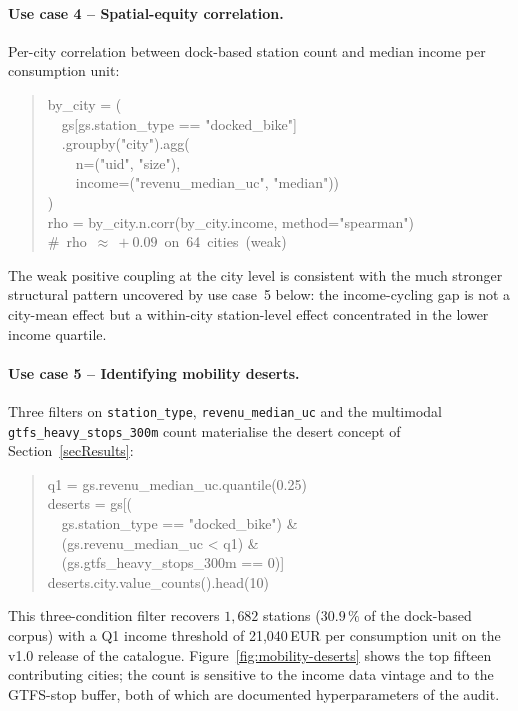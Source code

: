 \documentclass[11pt,a4paper]{article}
\begin{document}
\paragraph{Use case 4 -- Spatial-equity correlation.}
Per-city correlation between dock-based station count and median
income per consumption unit:
\begin{quote}\small\ttfamily
by\_city = (\\
\ \ gs[gs.station\_type == "docked\_bike"]\\
\ \ .groupby("city").agg(\\
\ \ \ \ n=("uid", "size"),\\
\ \ \ \ income=("revenu\_median\_uc", "median"))\\
)\\
rho = by\_city.n.corr(by\_city.income, method="spearman")\\
\#\ rho\ $\approx\ +0.09$\ on\ 64\ cities\ (weak)
\end{quote}
The weak positive coupling at the city level is consistent with the
much stronger structural pattern uncovered by use case~5 below: the
income-cycling gap is not a city-mean effect but a within-city
station-level effect concentrated in the lower income quartile.

\paragraph{Use case 5 -- Identifying mobility deserts.}
Three filters on \texttt{station\_type}, \texttt{revenu\_median\_uc}
and the multimodal \texttt{gtfs\_heavy\_stops\_300m} count
materialise the desert concept of Section~\ref{secResults}:
\begin{quote}\small\ttfamily
q1 = gs.revenu\_median\_uc.quantile(0.25)\\
deserts = gs[(\\
\ \ gs.station\_type == "docked\_bike") \&\\
\ \ (gs.revenu\_median\_uc < q1) \&\\
\ \ (gs.gtfs\_heavy\_stops\_300m == 0)]\\
deserts.city.value\_counts().head(10)
\end{quote}
This three-condition filter recovers $1{,}682$ stations
($30.9\,\%$ of the dock-based corpus) with a Q1 income threshold of
21{,}040\,EUR per consumption unit on the v1.0 release of the
catalogue. Figure~\ref{fig:mobility-deserts} shows the top fifteen
contributing cities; the count is sensitive to the income data
vintage and to the GTFS-stop buffer, both of which are documented
hyperparameters of the audit.
\end{document}
